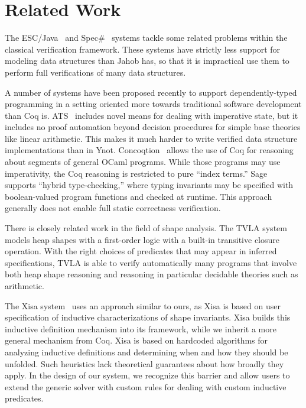 \documentclass[preprint,nocopyrightspace]{sigplanconf}
\begin{document}
{\section{Related Work}

The ESC/Java~\cite{esc-java} and Spec\#~\cite{spec-sharp} systems tackle some related problems within the classical verification framework.  These systems have strictly less support for modeling data structures than Jahob has, so that it is impractical use them to perform full verifications of many data structures.

A number of systems have been proposed recently to support dependently-typed programming in a setting oriented more towards traditional software development than Coq is.  ATS~\cite{ats} includes novel means for dealing with imperative state, but it includes no proof automation beyond decision procedures for simple base theories like linear arithmetic. This makes it much harder to write verified data structure implementations than in Ynot.  Concoqtion~\cite{concoqtion} allows the use of Coq for reasoning about segments of general OCaml programs.  While those programs may use imperativity, the Coq reasoning is restricted to pure ``index terms.''  Sage~\cite{sage} supports ``hybrid type-checking,'' where typing invariants may be specified with boolean-valued program functions and checked at runtime.  This approach generally does not enable full static correctness verification.

There is closely related work in the field of shape analysis.  The TVLA system~\cite{tvla} models heap shapes with a first-order logic with a built-in transitive closure operation.  With the right choices of predicates that may appear in inferred specifications, TVLA is able to verify automatically many programs that involve both heap shape reasoning and reasoning in particular decidable theories such as arithmetic.

The Xisa system~\cite{xisa} uses an approach similar to ours, as Xisa is based on user specification of inductive characterizations of shape invariants.  Xisa builds this inductive definition mechanism into its framework, while we inherit a more general mechanism from Coq.  Xisa is based on hardcoded algorithms for analyzing inductive definitions and determining when and how they should be unfolded.  Such heuristics lack theoretical guarantees about how broadly they apply.  In the design of our system, we recognize this barrier and allow users to extend the generic solver with custom rules for dealing with custom inductive predicates.

}
\end{document}
